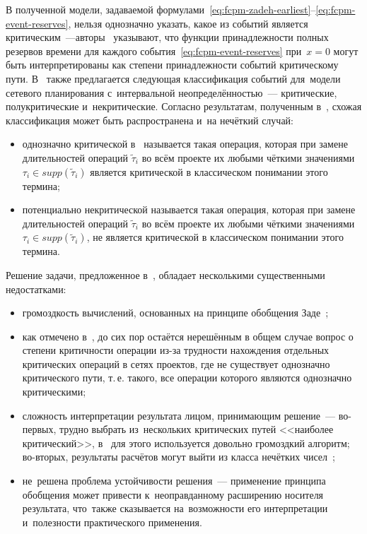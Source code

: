В полученной модели, задаваемой формулами~\eqref{eq:fcpm-zadeh-earliest}--\eqref{eq:fcpm-event-reserves}, нельзя однозначно указать, какое из событий является критическим~---авторы~\cite{Balashov_IPU} указывают, что функции принадлежности полных резервов времени для каждого события~\eqref{eq:fcpm-event-reserves} при~$x=0$ могут быть интерпретированы как степени принадлежности событий критическому пути. В~\cite{Balashov_IPU} также предлагается следующая классификация событий для~модели сетевого планирования с~интервальной неопределённостью~--- критические, полукритические и~некритические. Согласно результатам, полученным в~\cite{Chanas_Zielinski_Criticality}, схожая классификация может быть распространена и~на нечёткий случай:
\begin{itemize}
  \item однозначно критической в~\cite{Chanas_Zielinski_Criticality} называется такая операция, которая при замене длительностей операций $\tilde \tau_i$ во всём проекте их любыми чёткими значениями $\tau_i\in supp\left( \tilde \tau_i \right)$ является критической в классическом понимании этого термина;
  \item потенциально некритической называется такая операция, которая при замене длительностей операций $\tilde \tau_i$ во всём проекте их любыми чёткими значениями $\tau_i\in supp\left( \tilde \tau_i \right)$, не является критической в классическом понимании этого термина.
\end{itemize}

Решение задачи, предложенное в~\cite{Balashov_IPU}, обладает несколькими существенными недостатками:
\begin{itemize}
  \item громоздкость вычислений, основанных на принципе обобщения Заде~\cite{Rotshtein, Kruglov_Balashov};
  \item как отмечено в~\cite{Chanas_Zielinski_Criticality}, до сих пор остаётся нерешённым в общем случае вопрос о степени критичности операции из-за трудности нахождения отдельных критических операций в сетях проектов, где не существует однозначно критического пути, т.\,е. такого, все операции которого являются однозначно критическими;
  \item сложность интерпретации результата лицом, принимающим решение~--- во-первых, трудно выбрать из~нескольких критических путей <<наиболее критический>>, в~\cite{Chanas_Zielinski_Criticality} для этого используется довольно громоздкий алгоритм; во-вторых, результаты расчётов могут выйти из класса нечётких чисел~\cite{Fedorova_FCPM_IPU};
  \item не~решена проблема устойчивости решения~--- применение принципа обобщения может привести к~неоправданному расширению носителя результата, что~также сказывается на~возможности его интерпретации и~полезности практического применения.
\end{itemize}

